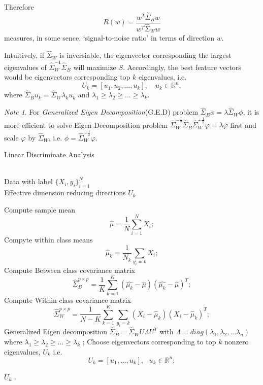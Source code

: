 \documentclass[twoside]{article}
\theoremstyle{definition}
\theoremstyle{definition}
\theoremstyle{remark}
\newtheorem*{note}{Note}
\def\R{{\mathbb R}}
\begin{document}
Therefore $$ R(w) = \frac{w^T \hat{\Sigma}_B w}{ w^T \hat{\Sigma}_W w} $$ 
measures, in some sence, `signal-to-noise ratio' in terms of direction $w$. 

Intuitively, if $\hat{\Sigma}_W$ is inversiable, the eigenvector corresponding the largest eigenvalues of $\hat{\Sigma}_W^{-1} \hat{\Sigma}_B$ will maximize $S$. Accordingly, the best feature vectors would be eigenvectors corresponding top $k$ eigenvalues, i.e.
$$U_k = [u_1,u_2,...,u_k], \quad u_k \in \mathbb{R}^n, $$
where $\hat{\Sigma}_B u_k = \hat{\Sigma}_W \lambda_k u_k$ and $\lambda_1 \ge \lambda_2 \ge ... 
\ge \lambda_k$.


\begin{note}
 For \emph{Generalized Eigen Decomposition}(G.E.D) problem $\hat{\Sigma}_B \phi =  \lambda \hat{\Sigma}_W \phi $, it is more efficient to solve Eigen Decomposition problem $\hat{\Sigma}_W^{-\frac{1}{2}} \hat{\Sigma}_B \hat{\Sigma}_W^{-\frac{1}{2}} \varphi = \lambda \varphi$ first and scale $\varphi$ by $\hat{\Sigma}_W$, i.e. $\phi = \hat{\Sigma}_W^{-\frac{1}{2}} \varphi $.
 \end{note}

\renewcommand{\algorithmicrequire}{ \textbf{Input:}} %
\renewcommand{\algorithmicensure}{ \textbf{Output:}} %

\begin{algorithm}[htb]   
\caption{Linear Discriminate Analysis}   
\label{alg:lda}   
\begin{algorithmic}[1] %
\REQUIRE ~~\\ %
 Data with label $\{X_i,y_i\}_{i=1}^N $
\ENSURE ~~\\ %
Effective dimension reducing directions $U_k$

\STATE Compute sample mean $$\hat{\mu} = \frac{1}{N} \sum\limits_{i=1}^N X_i ;$$   
\STATE Compyte within class means $$ \hat{\mu}_k = \frac{1}{N_k} \sum\limits_{y_i=k} X_i ;$$ 
\STATE Compute Between class covariance matrix 
 $$\hat{\Sigma}_B^{p\times p} = \frac{1}{K} \sum_{k=1}^K(\hat{\mu_k} - \hat{\mu})(\hat{\mu_k} - \hat{\mu})^T ;$$  
\STATE Compute Within class covariance matrix 
 $$\hat{\Sigma}_W^{p\times p}  = \frac{1}{N-K} \sum\limits_{k=1}^K\sum\limits_{y_i=k}(X_i - \hat{\mu}_k)(X_i - \hat{\mu}_k)^T;$$
\STATE Generalized Eigen decomposition $\hat{\Sigma}_B = \hat{\Sigma}_W U\Lambda U^T $ with $\Lambda = diag(\lambda_1,\lambda_2,...\lambda_n)$ where  $\lambda_1 \ge \lambda_2 \ge ... \ge \lambda_k$ ;
\STATE Choose eigenvectors corresponding to top $k$ nonzero eigenvalues, $U_k$ i.e.
$$U_k=[u_1,\ldots,u_k], \ \ \ u_k\in \R^n ;$$ 

\RETURN $U_k$ . %
\end{algorithmic}  
\end{algorithm}  
\end{document}
